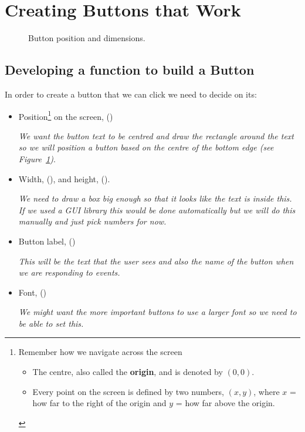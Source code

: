 \documentclass{coderdojo}
\begin{document}
\section{Creating Buttons that Work}\label{sec:buttons}

\begin{figure}[H]
\centering\larger[2]\vspace{-18pt}
\caption{Button position and dimensions.\label{fig:button}}
\end{figure}

\subsection{Developing a function to build a Button}

In order to create a button that we can click we need to decide on its:
\begin{itemize}
\item Position\footnote{Remember how we navigate across the screen
\begin{itemize}
\item
The centre, also called the {\bf origin}, and is denoted by $(0,0)$.
\item
Every point on the screen is defined by two numbers, $(x,y)$, where $x$ = how far to the right of the origin and $y$ = how far above the origin.
\end{itemize}} on the screen, ()

{\em We want the button text to be centred and draw the rectangle around the text so we will position a button based on the centre of the bottom edge (see Figure~\ref{fig:button})}.

\item Width, (), and height, ().

{\em
We need to draw a box big enough so that it looks like the text is inside this. If we used a GUI library this would be done automatically but we will do this manually and just pick numbers for now.}

\item Button label, ()

{\em This will be the text that the user sees and also the name of the button when we are responding to events.}

\item Font, ()

{\em
We might want the more important buttons to use a larger font so we need to be able to set this.}

\end{itemize}
\end{document}
